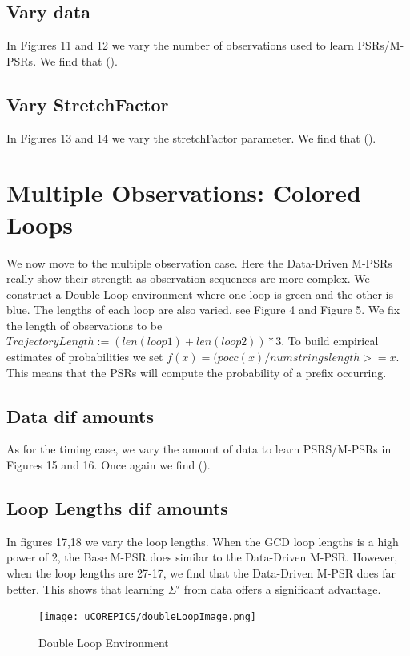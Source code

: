 \subsection{Vary data}

In Figures 11 and 12 we vary the number of observations used to learn PSRs/M-PSRs. We find that ().

\subsection{Vary StretchFactor}

In Figures 13 and 14 we vary the stretchFactor parameter. We find that ().

\section{Multiple Observations: Colored Loops}

We now move to the multiple observation case. Here the Data-Driven M-PSRs really show their strength as observation sequences are more complex. We construct a Double Loop environment where one loop is green and the other is blue. The lengths of each loop are also varied, see Figure 4 and Figure 5. We fix the length of observations to be $TrajectoryLength := (len(loop1) + len(loop2))*3$. To build empirical estimates of probabilities we set $f(x)=(pocc(x)/numstringslength>=x$. This means that the PSRs will compute the probability of a prefix occurring.

\subsection{Data dif amounts}

As for the timing case, we vary the amount of data to learn PSRS/M-PSRs in Figures 15 and 16. Once again we find ().

\subsection{Loop Lengths dif amounts}
In figures 17,18 we vary the loop lengths. When the GCD loop lengths is a high power of 2, the Base M-PSR does similar to the Data-Driven M-PSR. However, when the loop lengths are 27-17, we find that the Data-Driven M-PSR does far better. This shows that learning $\Sigma'$ from data offers a significant advantage.


\begin{figure}[ht!]
\centering
\texttt{[image: uCOREPICS/doubleLoopImage.png]}
\caption{Double Loop Environment\label{overflow}}
\end{figure}

